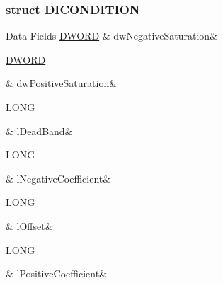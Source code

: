 \subsubsection{struct D\-I\-C\-O\-N\-D\-I\-T\-I\-O\-N}
\begin{DoxyFields}{Data Fields}
\hypertarget{a00003_ab8ef88f6ad4b78b4144f8b4874299286}{\hyperlink{a00003_a50e15ae51c87ae06ab29c8148cb5f36c}{D\-W\-O\-R\-D}}\label{a00003_ab8ef88f6ad4b78b4144f8b4874299286}
&
dw\-Negative\-Saturation&
\\
\hline

\hypertarget{a00003_a44d4b9216780dac85a29bc6c8cd17e99}{\hyperlink{a00003_a50e15ae51c87ae06ab29c8148cb5f36c}{D\-W\-O\-R\-D}}\label{a00003_a44d4b9216780dac85a29bc6c8cd17e99}
&
dw\-Positive\-Saturation&
\\
\hline

\hypertarget{a00003_af30a27eff7622fb9185a6217cbbcf99a}{L\-O\-N\-G}\label{a00003_af30a27eff7622fb9185a6217cbbcf99a}
&
l\-Dead\-Band&
\\
\hline

\hypertarget{a00003_a00b41a900a3d8351933fb983a2a4d65c}{L\-O\-N\-G}\label{a00003_a00b41a900a3d8351933fb983a2a4d65c}
&
l\-Negative\-Coefficient&
\\
\hline

\hypertarget{a00003_a2e20f7009060c677fbc0331de06a4c1c}{L\-O\-N\-G}\label{a00003_a2e20f7009060c677fbc0331de06a4c1c}
&
l\-Offset&
\\
\hline

\hypertarget{a00003_a4860a93a1f284b125078f820cfa7dc69}{L\-O\-N\-G}\label{a00003_a4860a93a1f284b125078f820cfa7dc69}
&
l\-Positive\-Coefficient&
\\
\hline

\end{DoxyFields}
\label{d4/de8/a00061}
\hypertarget{a00003_d4/de8/a00061}{}
